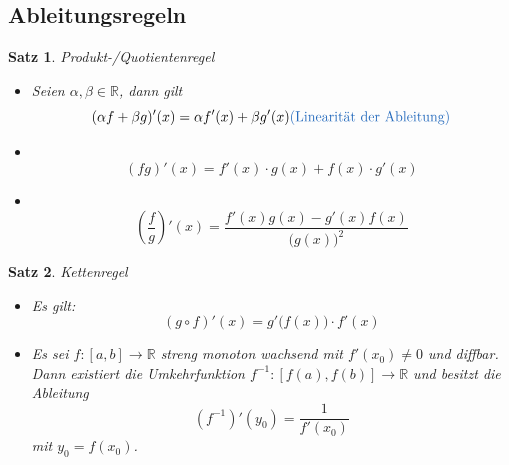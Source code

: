 \documentclass[12pt,a4paper]{article}%
\newtheorem{satz}{Satz}[section]
\numberwithin{equation}{section}
\newcommand{\R}{\mathbb{R}} %
\def\colBlue#1{\begingroup\color{NavyBlue}{#1}\endgroup}
\numberwithin{equation}{subsection}
\begin{document}
  \subsection{Ableitungsregeln}
  \begin{satz} Produkt-/Quotientenregel\newline
    \vspace{-0.5cm}
    \begin{itemize}
      \item[a) ] Seien $\alpha ,\beta \in \R$, dann gilt
        \begin{equation}
          (\alpha f + \beta g)'(x) = \alpha f'(x) + \beta g'(x) \text{\colBlue{(Linearität der Ableitung)}}
        \end{equation}
      \item[b) ] ~\\[-28pt]
        \begin{equation}
          (fg)'(x) = f'(x)\cdot g(x)+f(x) \cdot g'(x)
        \end{equation}
      \item[c) ] ~\\[-28pt]
        \begin{equation}
          (\frac{f}{g})'(x) = \frac{f'(x)g(x)-g'(x)f(x)}{\big(g(x)\big)^2}
        \end{equation}
    \end{itemize}
  \end{satz}
  \begin{satz} Kettenregel\newline
    \vspace{-0.5cm}
    \begin{itemize}
      \item[a) ]Es gilt:
      \begin{equation}
        (g \circ f)'(x) = g' \big(f(x)\big) \cdot f'(x)
      \end{equation}
      \item[b) ] Es sei $f: [a,b] \rightarrow \R$ streng monoton wachsend mit $f'(x_0) \neq 0$ und diffbar. Dann existiert die Umkehrfunktion $f^{-1}:[f(a), f(b)] \rightarrow \R$ und besitzt die Ableitung
      \begin{equation}
        \left( f^{-1}\right)'(y_0) = \frac{1}{f'(x_0)}
      \end{equation}
      mit $y_0 = f(x_0)$.
    \end{itemize}
  \end{satz}
  \newpage
  
\end{document}
